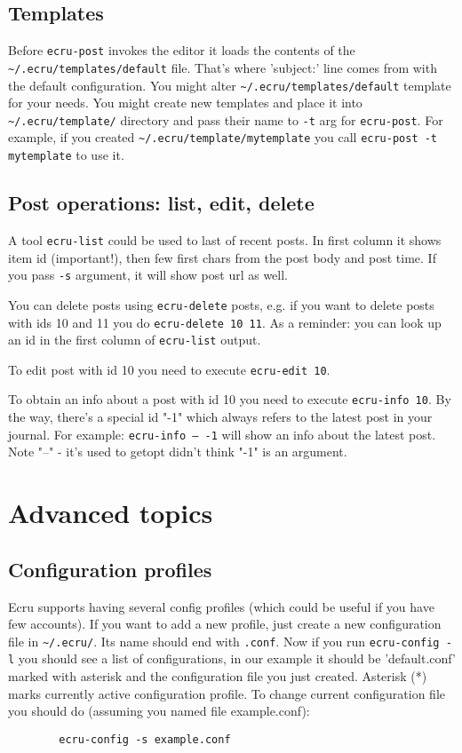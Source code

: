 \documentclass{article}
\begin{document}
	\subsection{Templates}
	Before {\tt ecru-post} invokes the editor it loads the contents of the {\tt \verb+~+/.ecru/templates/default} file. 
	That's where 'subject:' line comes from with the default configuration. You might alter 
	{\tt \verb+~+/.ecru/templates/default} template for your needs. You might create new templates and place it into
	{\tt \verb+~+/.ecru/template/} directory and pass their name to {\tt -t} arg for {\tt ecru-post}. For example,
	if you created {\tt \verb+~+/.ecru/template/mytemplate} you call {\tt ecru-post -t mytemplate} to use it.

	\subsection{Post operations: list, edit, delete}
	A tool {\tt ecru-list} could be used to last of recent posts. In first column it shows item id (important!),
	then few first chars from the post body and post time. If you pass {\tt -s} argument, it will show post url
	as well.

	You can delete posts using {\tt ecru-delete} posts, e.g. if you want to delete posts with ids 10 and 11 you
	do {\tt ecru-delete 10 11}. As a reminder: you can look up an id in the first column of {\tt ecru-list} 
	output.

	To edit post with id 10 you need to execute {\tt ecru-edit 10}. 

	To obtain an info about a post with id 10 you need to execute {\tt ecru-info 10}. By the way, there's a special
	id "-1" which always refers to the latest post in your journal. For example: {\tt ecru-info -- -1} will
	show an info about the latest post. Note "--" - it's used to getopt didn't think "-1" is an argument.
     \section{Advanced topics}
       \subsection{Configuration profiles}
	Ecru supports having several config profiles (which could be useful if you have few accounts). If you want to
	add a new profile, just create a new configuration file in {\tt \verb+~+/.ecru/}. Its name should end with
	{\tt .conf}. 
	Now if you run {\tt ecru-config -l} you should see a list of configurations, in our example it should be
	'default.conf' marked with asterisk and the configuration file you just created. Asterisk (*) marks
	currently active configuration profile. To change current configuration file you should do (assuming
	you named file example.conf): 
	\begin{verbatim}
		ecru-config -s example.conf
	\end{verbatim}
\end{document}
